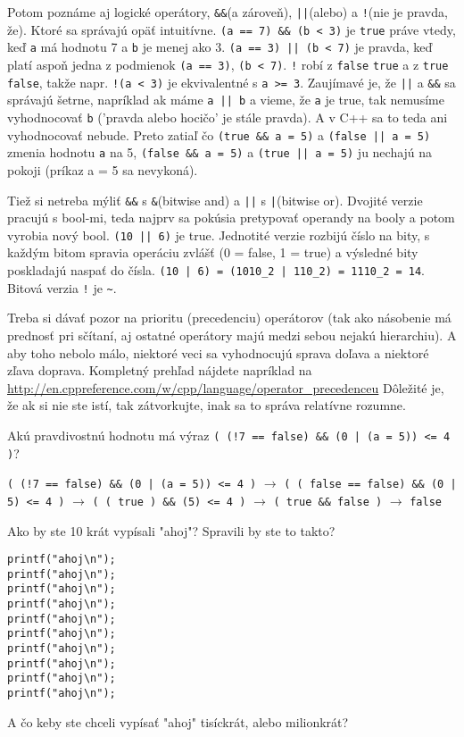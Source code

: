 Potom poznáme aj logické operátory, \verb!&&!(a zároveň), \verb!||!(alebo) a
\verb'!'(nie je pravda, že). Ktoré sa správajú opäť intuitívne.  
\verb!(a == 7) && (b < 3)! je \verb!true! práve vtedy, keď \verb!a! má hodnotu 7 a
\verb!b! je menej ako 3. \verb!(a == 3) || (b < 7)! je pravda, keď platí aspoň jedna
z podmienok \verb!(a == 3)!, \verb!(b < 7)!. \verb'!' robí z 
\verb!false! \verb!true! a z \verb!true! \verb!false!, takže napr. \verb'!(a < 3)' je
ekvivalentné s \verb'a >= 3'.  Zaujímavé je, že \verb!||! a \verb!&&! sa
správajú šetrne, napríklad ak máme \verb!a || b! a vieme, že \verb!a! je true, tak
nemusíme vyhodnocovať \verb!b! ('pravda alebo hocičo' je stále pravda). A v C++ sa
to teda ani vyhodnocovať nebude.  Preto zatiaľ čo \verb!(true && a = 5)! a
\verb!(false || a = 5)!  zmenia hodnotu \verb!a! na 5, \verb!(false && a = 5)! a
\verb!(true || a = 5)! ju nechajú na pokoji (príkaz a = 5 sa nevykoná).

Tiež si netreba mýliť \verb!&&! s \verb!&!(bitwise and) a \verb!||! s
\verb!|!(bitwise or). Dvojité verzie pracujú s bool-mi, teda najprv sa pokúsia
pretypovať operandy na booly a potom vyrobia nový bool. \verb!(10 || 6)! je true.
Jednotité verzie rozbijú číslo na bity, s každým bitom spravia operáciu zvlášť
(0 = false, 1 = true) a výsledné bity poskladajú naspať do čísla. 
\verb!(10 | 6) = (1010_2 | 110_2) = 1110_2 = 14!.  Bitová verzia \verb'!' je \verb'~'.

Treba si dávať pozor na prioritu (precedenciu) operátorov (tak ako násobenie má
prednosť pri sčítaní, aj ostatné operátory majú medzi sebou nejakú hierarchiu).
A aby toho nebolo málo, niektoré veci sa vyhodnocujú sprava doľava a niektoré
zľava doprava. Kompletný prehľad nájdete napríklad na
\url{http://en.cppreference.com/w/cpp/language/operator\_precedenceu} Dôležité
je, že ak si nie ste istí, tak zátvorkujte, inak sa to správa relatívne
rozumne.

\cvicenie Akú pravdivostnú hodnotu má výraz 
\verb'( (!7 == false) && (0 | (a = 5)) <= 4 )'?

\riesenie \verb'( (!7 == false) && (0 | (a = 5)) <= 4 )' $\rightarrow$
\verb'( ( false == false) && (0 | 5) <= 4 )' $\rightarrow$
\verb'( ( true ) && (5) <= 4 )' $\rightarrow$ \verb'( true && false )' $\rightarrow$ \verb'false'


Ako by ste 10 krát vypísali "ahoj"? Spravili by ste to takto?
\begin{lstlisting}
printf("ahoj\n");
printf("ahoj\n");
printf("ahoj\n");
printf("ahoj\n");
printf("ahoj\n");
printf("ahoj\n");
printf("ahoj\n");
printf("ahoj\n");
printf("ahoj\n");
printf("ahoj\n");
\end{lstlisting}
A čo keby ste chceli vypísať "ahoj" tisíckrát, alebo milionkrát?


